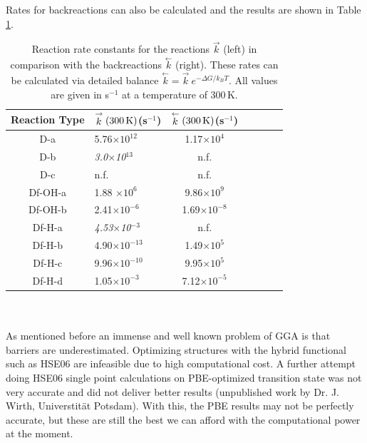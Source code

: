 \documentclass[11pt,DIV=13,BCOR=5mm,a4paper,headinclude]{scrbook}
\begin{document}
Rates for backreactions can also be calculated and the results are shown in Table \ref{tab:backreactions}.
\begin{table}[ht]
  \centering
  \caption{Reaction rate constants for the reactions $\stackrel{\rightarrow}{k}$ (left) in comparison with the backreactions $\stackrel{\leftarrow}{k}$ (right).
These rates can be calculated via detailed balance $\stackrel{\leftarrow}{k}  = \stackrel{\rightarrow}{k} \ e^{-\Delta G/k_B T}$.
All values are given in s$^{-1}$ at a temperature of $300\,$K.}
  \begin{tabular}{cl|cc|cc|c}
  \toprule
\small{Reaction Type} & \small{$\stackrel{\rightarrow}{k}(\textrm{300\,K})$(s$^{-1}$)} &  \small{$\stackrel{\leftarrow}{k}(\textrm{300\,K})$(s$^{-1}$)} \\\midrule
 \small{D-a}   & \small{5.76$\times 10^{12}$} &\small{1.17$\times 10^4$}\\
 \small{D-b}   & \small{\textit{3.0$\times$10$^{13}$}} & \small{n.f.} \\
 \small{D-c}   & \small{n.f.} & \small{n.f.}  \\\midrule
 \small{Df-OH-a} & \small{1.88 $\times  10^6$}&\small{9.86$\times 10^9$} \\
 \small{Df-OH-b}  & \small{2.41$\times 10^{-6}$}& \small{1.69$\times 10^{-8}$}\\\midrule
 \small{Df-H-a} & \small{\textit{4.53$\times$10$^{-3}$}} &\small{n.f.} \\
 \small{Df-H-b}  & \small{4.90$\times 10^{-13}$} &\small{1.49$\times 10^5$} \\
 \small{Df-H-c} & \small{9.96$\times 10^{-10}$}& \small{9.95$\times 10^5$}\\
 \small{Df-H-d} & \small{1.05$\times 10^{-3}$} &\small{7.12$\times 10^{-5}$} \\\bottomrule
  \end{tabular}
  \label{tab:backreactions}
\end{table}
\\\\

As mentioned before an immense and well known problem of GGA is that barriers are underestimated\cite{Zhao05}.
Optimizing structures with the hybrid functional such as HSE06 are infeasible due to high computational cost. %
A further attempt doing HSE06 single point calculations on PBE-optimized transition state was not very accurate and did not deliver better results (unpublished work by Dr. J. Wirth, Universtität Potsdam).
With this, the PBE results may not be perfectly accurate, but these are still the best we can afford with the computational power at the moment.
\end{document}
